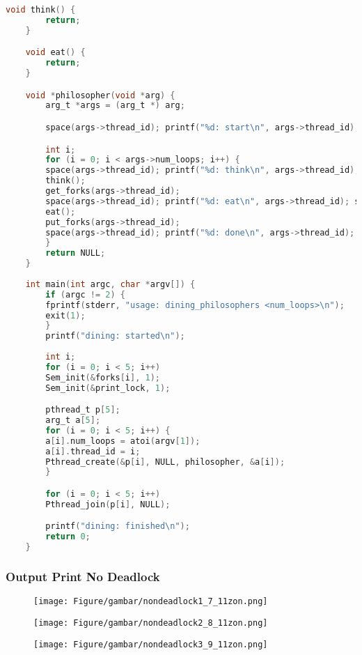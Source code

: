 \documentclass[11pt,a4paper]{article}
\begin{document}
\begin{lstlisting}[language=C,label={labelkode}]
    void think() {
        return;
    }

    void eat() {
        return;
    }

    void *philosopher(void *arg) {
        arg_t *args = (arg_t *) arg;

        space(args->thread_id); printf("%d: start\n", args->thread_id); space_end();

        int i;
        for (i = 0; i < args->num_loops; i++) {
	    space(args->thread_id); printf("%d: think\n", args->thread_id); space_end();
	    think();
	    get_forks(args->thread_id);
	    space(args->thread_id); printf("%d: eat\n", args->thread_id); space_end();
	    eat();
	    put_forks(args->thread_id);
	    space(args->thread_id); printf("%d: done\n", args->thread_id); space_end();
        }
        return NULL;
    }
                                                                             
    int main(int argc, char *argv[]) {
        if (argc != 2) {
	    fprintf(stderr, "usage: dining_philosophers <num_loops>\n");
	    exit(1);
        }
        printf("dining: started\n");
    
        int i;
        for (i = 0; i < 5; i++) 
	    Sem_init(&forks[i], 1);
        Sem_init(&print_lock, 1);

        pthread_t p[5];
        arg_t a[5];
        for (i = 0; i < 5; i++) {
	    a[i].num_loops = atoi(argv[1]);
	    a[i].thread_id = i;
	    Pthread_create(&p[i], NULL, philosopher, &a[i]);
        }

        for (i = 0; i < 5; i++) 
	    Pthread_join(p[i], NULL); 

        printf("dining: finished\n");
        return 0;
    }
    \end{lstlisting}
  \newpage
\subsubsection{\textbf{Output Print No Deadlock}}
    \begin{figure}[h]
    \centering
    \texttt{[image: Figure/gambar/nondeadlock1\_7\_11zon.png]}
    \label{fig:my_label}
    
    \centering
    \texttt{[image: Figure/gambar/nondeadlock2\_8\_11zon.png]}
    \label{fig:my_label}
    
    \centering
    \texttt{[image: Figure/gambar/nondeadlock3\_9\_11zon.png]}
    \label{fig:my_label}
\end{figure} 
\end{document}
